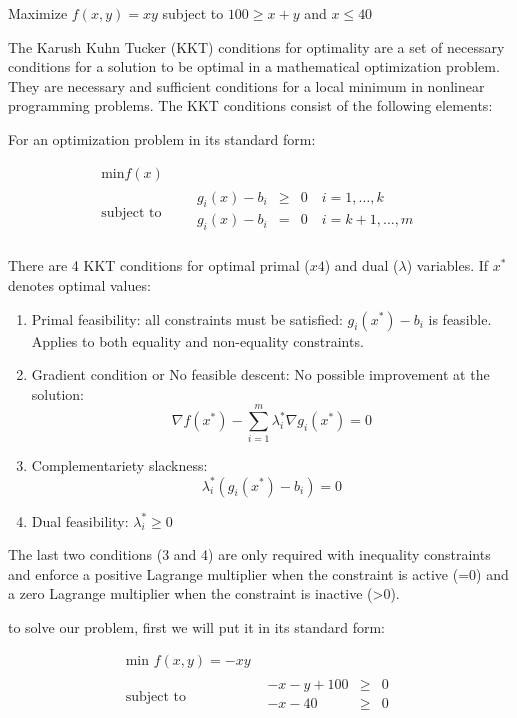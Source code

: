 \Exercise Maximize $f(x,y)=xy$ subject to $100 \geq x+y$ and $x\leq 40$

\Answer 

The Karush Kuhn Tucker (KKT) conditions  for optimality are a set of necessary conditions for a solution to be optimal in a mathematical optimization problem. They are necessary and sufficient conditions for a local minimum in nonlinear programming problems. The KKT conditions consist of the following elements:

For an optimization problem in its standard form:

\begin{equation*}
  \begin{aligned}
    \text{min} f(x) \\
    \text{subject to }\quad &
    \begin{array}{rcl}
      g_i(x)-b_i  & \geq & 0 \quad i=1,\ldots,k \\
      g_i(x)-b_i  & = & 0 \quad i=k+1,\ldots,m \\
    \end{array}
  \end{aligned}
\end{equation*}

There are 4 KKT conditions for optimal primal ($x4$) and dual ($\lambda$) variables. If $x^*$ denotes optimal values:
\begin{enumerate}
  \item Primal feasibility: all constraints must be satisfied: $g_i(x^*)-b_i$ is feasible. Applies to both equality and non-equality constraints.
  \item Gradient condition or No feasible descent: No possible improvement at the solution: 
  \[ \nabla f(x^*)-\sum_{i=1}^m \lambda_i^* \nabla g_i (x^*)=0\]
  \item Complementariety slackness: 
  \[\lambda_i^* (g_i(x^*)-b_i)=0\]
  \item Dual feasibility: $\lambda_i^*\geq 0$
\end{enumerate}

The last two conditions (3 and 4) are only required with inequality constraints and enforce a positive Lagrange multiplier when the constraint is active (=0) and a zero Lagrange multiplier when the constraint is inactive (>0). 

to solve our problem, first we will put it in its standard form:


\begin{equation*}
  \begin{aligned}
    \text{min } f(x,y)=-xy \\
    \text{subject to }\quad &
    \begin{array}{rcl}
      -x-y+100  & \geq & 0  \\
      -x-40 & \geq & 0  \\
    \end{array}
  \end{aligned}
\end{equation*}


